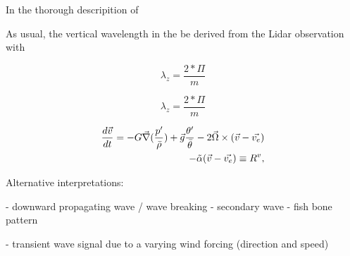 In the thorough descripition of 


As usual, the vertical wavelength in the  be derived from the Lidar observation with

\begin{equation}
    \lambda_z = \frac{2*\Pi}{m} 
    \label{equ:lambdaz}
\end{equation}

\begin{equation}
    \lambda_z = \frac{2*\Pi}{m} 
    \label{equ:lambdaz}
\end{equation}


\begin{equation}
\begin{aligned}
    \frac{d \Vec{v}}{dt} = -G \Vec{\nabla} (\frac{p'}{\bar{\rho}}) +  \Vec{g} \frac{\theta'}{\bar{\theta}} - 2 \Vec{\Omega} \times (\Vec{v}-\Vec{v_e}) \\
    - \Tilde{\alpha} (\Vec{v}-\Vec{v_e}) \equiv R^{v},
    \label{equ:momEqu}
\end{aligned}
\end{equation}

Alternative interpretations:

- downward propagating wave / wave breaking - secondary wave - fish bone pattern

- transient wave signal due to a varying wind forcing (direction and speed) 


